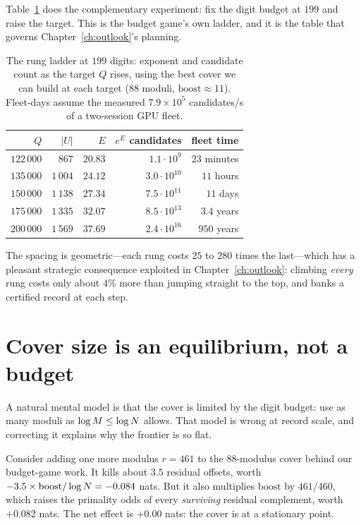 Table~\ref{tab:ladder} does the complementary experiment: fix the digit budget
at $199$ and raise the target. This is the budget game's own ladder, and it is
the table that governs Chapter~\ref{ch:outlook}'s planning.

\begin{table}[h]
\centering\small
\caption{The rung ladder at $199$ digits: exponent and candidate count as the
target $Q$ rises, using the best cover we can build at each target ($88$ moduli,
$\mathrm{boost}\approx11$). Fleet-days assume the measured
$7.9\times10^{5}$ candidates/s of a two-session GPU fleet.}\label{tab:ladder}
\begin{tabular}{rrrrr}
\toprule
$Q$ & $|U|$ & $E$ & $e^{E}$ candidates & fleet time\\
\midrule
$122\,000$ & $867$ & $20.83$ & $1.1\cdot10^{9}$ & $23$ minutes\\
$135\,000$ & $1\,004$ & $24.12$ & $3.0\cdot10^{10}$ & $11$ hours\\
$150\,000$ & $1\,138$ & $27.34$ & $7.5\cdot10^{11}$ & $11$ days\\
$175\,000$ & $1\,335$ & $32.07$ & $8.5\cdot10^{13}$ & $3.4$ years\\
$200\,000$ & $1\,569$ & $37.69$ & $2.4\cdot10^{16}$ & $950$ years\\
\bottomrule
\end{tabular}
\end{table}

The spacing is geometric---each rung costs $25$ to $280$ times the last---which
has a pleasant strategic consequence exploited in Chapter~\ref{ch:outlook}:
climbing \emph{every} rung costs only about $4\%$ more than jumping straight to
the top, and banks a certified record at each step.

\section{Cover size is an equilibrium, not a budget}\label{sec:equilibrium}

A natural mental model is that the cover is limited by the digit budget: use as
many moduli as $\log M\le\log N$ allows. That model is wrong at record scale,
and correcting it explains why the frontier is so flat.

Consider adding one more modulus $r=461$ to the $88$-modulus cover behind our
budget-game work. It kills about $3.5$ residual offsets, worth
$-3.5\times\mathrm{boost}/\log N=-0.084$ nats. But it also multiplies
$\mathrm{boost}$ by $461/460$, which raises the primality odds of every
\emph{surviving} residual complement, worth $+0.082$ nats. The net effect is
$+0.00$ nats: the cover is at a stationary point.


